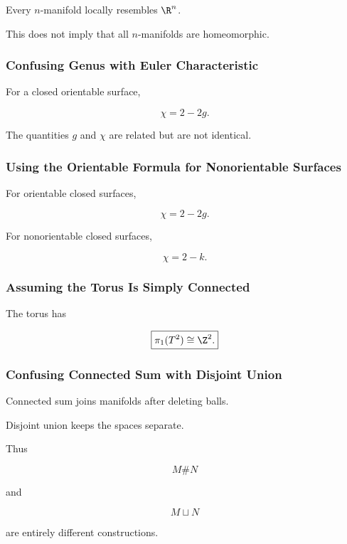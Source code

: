 Every \(n\)-manifold locally resembles \(\R^n\).

This does not imply that all \(n\)-manifolds are homeomorphic.

\subsubsection{Confusing Genus with Euler Characteristic}

For a closed orientable surface,

\[
\chi=2-2g.
\]

The quantities \(g\) and \(\chi\) are related but are not identical.

\subsubsection{Using the Orientable Formula for Nonorientable Surfaces}

For orientable closed surfaces,

\[
\chi=2-2g.
\]

For nonorientable closed surfaces,

\[
\chi=2-k.
\]

\subsubsection{Assuming the Torus Is Simply Connected}

The torus has

\[
\boxed{
\pi_1(T^2)\cong\Z^2.
}
\]

\subsubsection{Confusing Connected Sum with Disjoint Union}

Connected sum joins manifolds after deleting balls.

Disjoint union keeps the spaces separate.

Thus

\[
M\#N
\]

and

\[
M\sqcup N
\]

are entirely different constructions.

